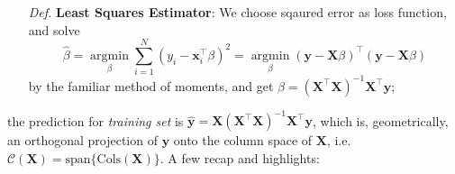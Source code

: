 \documentclass[a4paper, 11pt]{article}
\DeclareMathOperator*{\argmin}{argmin}
\begin{document}
\begin{itemize}
	\item[\textit{Def.}] \textbf{Least Squares Estimator}: We choose sqaured error as loss function, and solve
	$$
	\hat{\beta} = \argmin\limits_{\beta} \sum_{i=1}^N (y_i - \bm{x}_i^{\top}\beta)^2 = \argmin\limits_{\beta} (\bm{y}-\bm{X}\beta)^{\top}(\bm{y}-\bm{X}\beta)
	$$
	by the familiar method of moments, and get $\hat{\beta} = (\bm{X}^{\top} \bm{X})^{-1}\bm{X}^{\top} \bm{y}$;
	~\\
\end{itemize}
the prediction for \emph{training set} is $\hat{\bm{y}}=\bm{X}(\bm{X}^{\top} \bm{X})^{-1}\bm{X}^{\top} \bm{y}$, which is, geometrically, an orthogonal projection of $\bm{y}$ onto the column space of $\bm{X}$, i.e. $\mathcal{C}(\bm{X})=\text{span}\{\text{Cols}(\bm{X})\}$. A few recap and highlights: 
\end{document}
